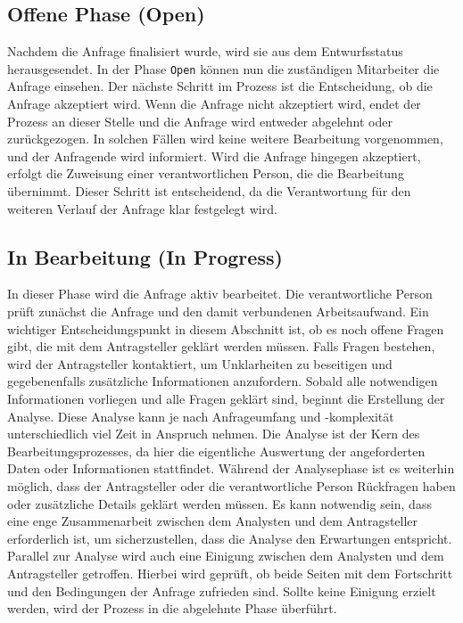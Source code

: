 \subsection*{Offene Phase (Open)}
Nachdem die Anfrage finalisiert wurde, wird sie aus dem Entwurfsstatus herausgesendet. In der Phase \texttt{Open}  können nun die zuständigen Mitarbeiter die Anfrage einsehen.
\newline
Der nächste Schritt im Prozess ist die Entscheidung, ob die Anfrage akzeptiert wird. Wenn die Anfrage nicht akzeptiert wird, endet der Prozess an dieser Stelle und die Anfrage wird entweder abgelehnt oder zurückgezogen. In solchen Fällen wird keine weitere Bearbeitung vorgenommen, und der Anfragende wird informiert.
\newline
Wird die Anfrage hingegen akzeptiert, erfolgt die Zuweisung einer verantwortlichen Person, die die Bearbeitung übernimmt. Dieser Schritt ist entscheidend, da die Verantwortung für den weiteren Verlauf der Anfrage klar festgelegt wird.
\subsection*{In Bearbeitung (In Progress)}
In dieser Phase wird die Anfrage aktiv bearbeitet. Die verantwortliche Person prüft zunächst die Anfrage und den damit verbundenen Arbeitsaufwand. Ein wichtiger Entscheidungspunkt in diesem Abschnitt ist, ob es noch offene Fragen gibt, die mit dem Antragsteller geklärt werden müssen. Falls Fragen bestehen, wird der Antragsteller kontaktiert, um Unklarheiten zu beseitigen und gegebenenfalls zusätzliche Informationen anzufordern.
\newline
Sobald alle notwendigen Informationen vorliegen und alle Fragen geklärt sind, beginnt die Erstellung der Analyse. Diese Analyse kann je nach Anfrageumfang und -komplexität unterschiedlich viel Zeit in Anspruch nehmen. Die Analyse ist der Kern des Bearbeitungsprozesses, da hier die eigentliche Auswertung der angeforderten Daten oder Informationen stattfindet.
\newline
Während der Analysephase ist es weiterhin möglich, dass der Antragsteller oder die verantwortliche Person Rückfragen haben oder zusätzliche Details geklärt werden müssen. Es kann notwendig sein, dass eine enge Zusammenarbeit zwischen dem Analysten und dem Antragsteller erforderlich ist, um sicherzustellen, dass die Analyse den Erwartungen entspricht.
\newline
Parallel zur Analyse wird auch eine Einigung zwischen dem Analysten und dem Antragsteller getroffen. Hierbei wird geprüft, ob beide Seiten mit dem Fortschritt und den Bedingungen der Anfrage zufrieden sind. Sollte keine Einigung erzielt werden, wird der Prozess in die abgelehnte Phase überführt.
